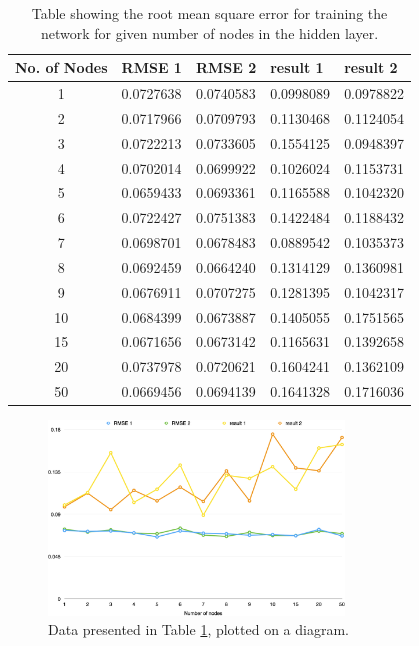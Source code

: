 \begin{table}
\begin{center}
\begin{tabular}{| c | l | l | l | l |} \hline 
  No. of Nodes & RMSE 1 & RMSE 2 & result 1 & result 2  \\ \hline \hline
  1 & 0.0727638 &  0.0740583  & 0.0998089  & 0.0978822   	\\ \hline
  2 & 0.0717966 &  0.0709793  & 0.1130468  & 0.1124054    	\\ \hline
  3 & 0.0722213 &  0.0733605  & 0.1554125  & 0.0948397   	\\ \hline
  4 & 0.0702014 &  0.0699922  & 0.1026024  & 0.1153731  	\\ \hline
  5 & 0.0659433 &  0.0693361  & 0.1165588  & 0.1042320		\\ \hline
  6 & 0.0722427 &  0.0751383  & 0.1422484  & 0.1188432		\\ \hline
  7 & 0.0698701 &  0.0678483  & 0.0889542  & 0.1035373		\\ \hline
  8 & 0.0692459 &  0.0664240  & 0.1314129  & 0.1360981		\\ \hline
  9 & 0.0676911 &  0.0707275  & 0.1281395  & 0.1042317		\\ \hline
 10 & 0.0684399 & 0.0673887  & 0.1405055  & 0.1751565		\\ \hline
 15 & 0.0671656 & 0.0673142  & 0.1165631  & 0.1392658		\\ \hline
 20 & 0.0737978 & 0.0720621  & 0.1604241  & 0.1362109		\\ \hline
 50 & 0.0669456 & 0.0694139  & 0.1641328  & 0.1716036		\\ \hline
\end{tabular}
\caption{Table showing the root mean square error for training the network for given number of nodes in the hidden layer.}
\label{table:rsmetable}
\end{center}
\end{table}


\begin{figure}[b]
	\centering
   \includegraphics[width=0.7\textwidth]{Figures/nodesperf}
\caption{Data presented in Table \ref{table:rsmetable}, plotted on a diagram.}
\end{figure}

